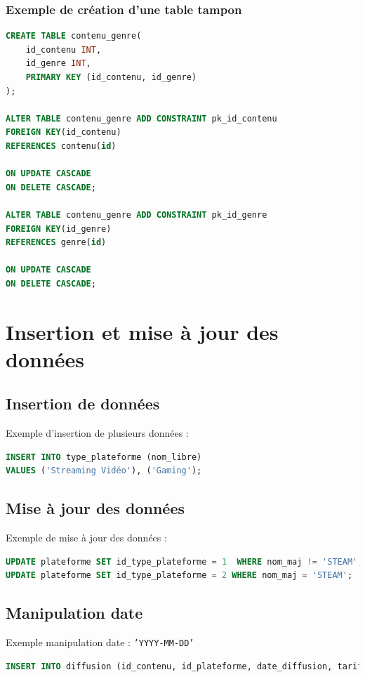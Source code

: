 \subsubsection{Exemple de création d'une table tampon}
\begin{lstlisting}[language=SQL]
CREATE TABLE contenu_genre(
    id_contenu INT,
    id_genre INT,
    PRIMARY KEY (id_contenu, id_genre)
);

ALTER TABLE contenu_genre ADD CONSTRAINT pk_id_contenu
FOREIGN KEY(id_contenu)
REFERENCES contenu(id)

ON UPDATE CASCADE
ON DELETE CASCADE;

ALTER TABLE contenu_genre ADD CONSTRAINT pk_id_genre
FOREIGN KEY(id_genre)
REFERENCES genre(id)

ON UPDATE CASCADE
ON DELETE CASCADE;
\end{lstlisting}

\section{Insertion et mise à jour des données}
\subsection{Insertion de données}
Exemple d'insertion de plusieurs données :
\begin{lstlisting}[language=SQL]
INSERT INTO type_plateforme (nom_libre)
VALUES ('Streaming Vidéo'), ('Gaming');
\end{lstlisting}

\subsection{Mise à jour des données}
Exemple de mise à jour des données :
\begin{lstlisting}[language=SQL]
UPDATE plateforme SET id_type_plateforme = 1  WHERE nom_maj != 'STEAM';
UPDATE plateforme SET id_type_plateforme = 2 WHERE nom_maj = 'STEAM';
\end{lstlisting}

\subsection{Manipulation date}
Exemple manipulation date : \texttt{'YYYY-MM-DD'}
\begin{lstlisting}[language=SQL]
INSERT INTO diffusion (id_contenu, id_plateforme, date_diffusion, tarif) VALUES (2, 2, '2000-04-05', 25)
\end{lstlisting}

